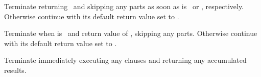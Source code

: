 \begin{LIST}{1cm}
\begin{LIST}{.5cm}
    {
      Terminate  returning \NIL\ and skipping any
       parts as soon as  is \NIL\ or \T,
      respectively. Otherwise continue  with its default
      return value set to \T.
    }

    {
      Terminate  when  is \T\ and return value of
      , skipping any  parts. Otherwise
      continue  with its default return value set to \NIL.
    }

    {
      Terminate  immediately executing any 
      clauses and returning any accumulated results.
    }
  \end{LIST}
\end{LIST}





